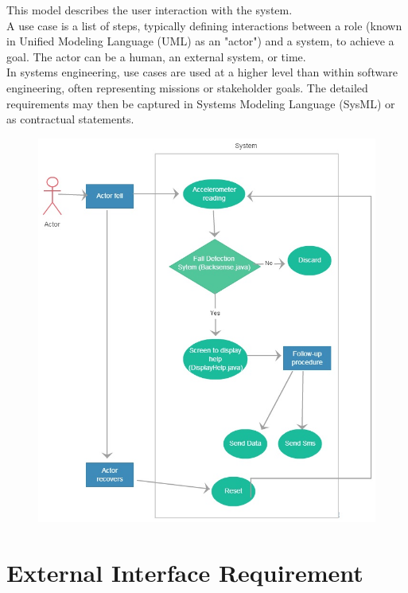 This model describes the user interaction with the system.\\
 A use case is a list of steps, typically defining interactions between a role (known in Unified Modeling Language (UML) as an "actor") and a system, to achieve a goal. The actor can be a human, an external system, or time. \\
In systems engineering, use cases are used at a higher level than within software engineering, often representing missions or stakeholder goals. The detailed requirements may then be captured in Systems Modeling Language (SysML) or as contractual statements.

\begin{figure}[h]
	\centering
	\includegraphics[height=0.61\textheight]{fig01/d_usec}
	\label{fig:RHP02}
\end{figure}



\newpage
\section{External Interface Requirement}
\label{sec:sec05}



